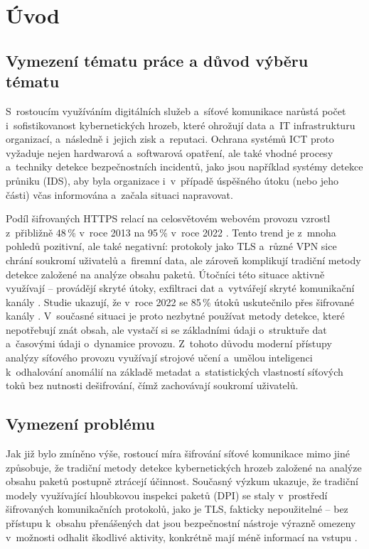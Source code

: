 \chapter*{Úvod}

\section*{Vymezení tématu práce a důvod výběru tématu}

S~rostoucím využíváním digitálních služeb a~síťové komunikace narůstá počet i~sofistikovanost kybernetických hrozeb, které ohrožují data a~IT infrastrukturu organizací, a~následně i~jejich zisk a~reputaci. Ochrana systémů ICT proto vyžaduje nejen hardwarová a~softwarová opatření, ale také vhodné procesy a~techniky detekce bezpečnostních incidentů, jako jsou například systémy detekce průniku (IDS), aby byla organizace i~v~případě úspěšného útoku (nebo jeho části) včas informována a~začala situaci napravovat.

Podíl šifrovaných HTTPS relací na celosvětovém webovém provozu vzrostl z~přibližně 48\,\% v~roce 2013 na 95\,\% v~roce 2022 \parencite{GoogleHTTPS2022}. Tento trend je z~mnoha pohledů pozitivní, ale také negativní: protokoly jako TLS a~různé VPN sice chrání soukromí uživatelů a~firemní data, ale zároveň komplikují tradiční metody detekce založené na analýze obsahu paketů. Útočníci této situace aktivně využívají -- provádějí skryté útoky, exfiltraci dat a~vytvářejí skryté komunikační kanály \parencite{Barut2020}. Studie ukazují, že v~roce 2022 se 85\,\% útoků uskutečnilo přes šifrované kanály \parencite{Zscaler2022}. V~současné situaci je proto nezbytné používat metody detekce, které nepotřebují znát obsah, ale vystačí si se základními údaji o~struktuře dat a~časovými údaji o~dynamice provozu. Z~tohoto důvodu moderní přístupy analýzy síťového provozu využívají strojové učení a~umělou inteligenci k~odhalování anomálií na základě metadat a~statistických vlastností síťových toků bez nutnosti dešifrování, čímž zachovávají soukromí uživatelů.

\section*{Vymezení problému}

Jak již bylo zmíněno výše, rostoucí míra šifrování síťové komunikace mimo jiné způsobuje, že tradiční metody detekce kybernetických hrozeb založené na analýze obsahu paketů postupně ztrácejí účinnost. Současný výzkum ukazuje, že tradiční modely využívající hloubkovou inspekci paketů (DPI) se staly v~prostředí šifrovaných komunikačních protokolů, jako je TLS, fakticky nepoužitelné -- bez přístupu k~obsahu přenášených dat jsou bezpečnostní nástroje výrazně omezeny v~možnosti odhalit škodlivé aktivity, konkrétně mají méně informací na vstupu \parencite{Papadogiannaki2022}.

